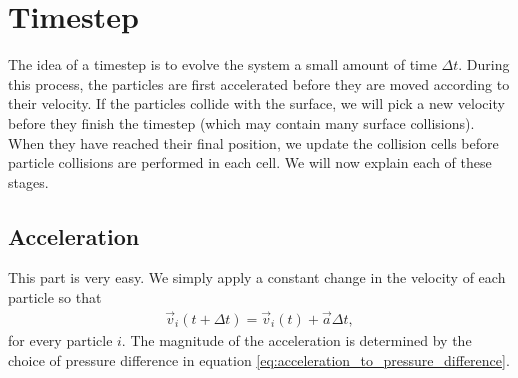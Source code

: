 \section{Timestep}
\label{sec:dsmc_implementation_timestep}
The idea of a timestep is to evolve the system a small amount of time $\Delta t$. During this process, the particles are first accelerated before they are moved according to their velocity. If the particles collide with the surface, we will pick a new velocity before they finish the timestep (which may contain many surface collisions). When they have reached their final position, we update the collision cells before particle collisions are performed in each cell. We will now explain each of these stages.
\subsection{Acceleration}
This part is very easy. We simply apply a constant change in the velocity of each particle so that
\begin{align}
	\vec v_i(t + \Delta t) = \vec v_i(t) + \vec a\Delta t,
\end{align}
for every particle $i$. The magnitude of the acceleration is determined by the choice of pressure difference in equation \eqref{eq:acceleration_to_pressure_difference}.
